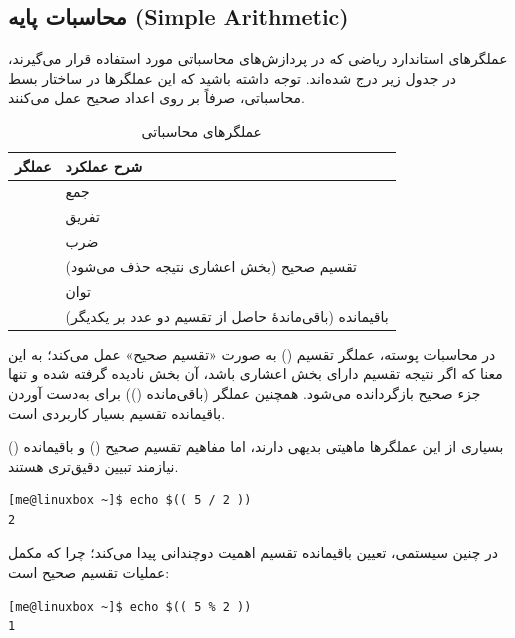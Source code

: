 \subsection{محاسبات پایه (Simple Arithmetic)}

عملگرهای استاندارد ریاضی که در پردازش‌های محاسباتی  مورد استفاده قرار می‌گیرند، در جدول زیر درج شده‌اند. توجه داشته باشید که این عملگرها در ساختار بسط محاسباتی، صرفاً بر روی اعداد صحیح عمل می‌کنند.

\begin{table}[htbp]
\centering
\caption{عملگرهای محاسباتی}
\label{tab:arith-ops-basic}
\begin{tabularx}{\textwidth}{c X}
\toprule
\textbf{عملگر} & \textbf{شرح عملکرد} \\
\midrule
\cmd{+} & جمع \\
\addlinespace
\cmd{-} & تفریق \\
\addlinespace
\cmd{*} & ضرب \\
\addlinespace
\cmd{/} & تقسیم صحیح (بخش اعشاری نتیجه حذف می‌شود) \\
\addlinespace
\cmd{**} & توان \\
\addlinespace
\cmd{\%} & باقیمانده (باقی‌ماندهٔ حاصل از تقسیم دو عدد بر یکدیگر) \\
\bottomrule
\end{tabularx}
\end{table}

در محاسبات پوسته، عملگر تقسیم (\cmd{/}) به صورت «تقسیم صحیح» عمل می‌کند؛ به این معنا که اگر نتیجه تقسیم دارای بخش اعشاری باشد، آن بخش نادیده گرفته شده و تنها جزء صحیح بازگردانده می‌شود. همچنین عملگر \cmd{\%} (باقی‌مانده ()) برای به‌دست آوردن باقیمانده تقسیم بسیار کاربردی است.

بسیاری از این عملگرها ماهیتی بدیهی دارند، اما مفاهیم تقسیم صحیح () و باقیمانده () نیازمند تبیین دقیق‌تری هستند.

\begin{latin}
\begin{lstlisting}
[me@linuxbox ~]$ echo $(( 5 / 2 ))
2
\end{lstlisting}
\end{latin}

در چنین سیستمی، تعیین باقیمانده تقسیم اهمیت دوچندانی پیدا می‌کند؛ چرا که مکمل عملیات تقسیم صحیح است:

\begin{latin}
\begin{lstlisting}
[me@linuxbox ~]$ echo $(( 5 % 2 ))
1
\end{lstlisting}
\end{latin}

